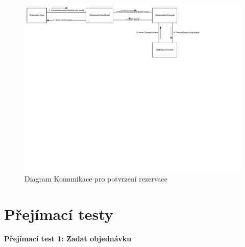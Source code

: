 \newpage
\begin{figure}[h!]
\begin{center}
\includegraphics[scale=0.75]{../02_Vysledne_modely/09_CommunicationDiagram-1.pdf}
\vspace{-250pt}
\caption{Diagram Komunikace pro potvrzení rezervace}
\label{fig:communication09-1}
\end{center}
\end{figure}


\newpage
\begin{landscape}	
\end{landscape}
\newpage

\newpage
\section*{Přejímací testy}

{\large\textbf{Přejímací test 1: Zadat objednávku}} \\

